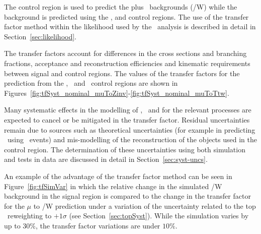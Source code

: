 The \mj control region is used to predict the \wj plus \ttbar~backgrounds (\ttbar/W) while the
\znunu background is predicted using the \mj, \mmj and \gj control regions. The use of 
the transfer factor method within the likelihood used by the
\alphat~analysis is described in detail in Section~\ref{sec:likelihood}.
%

The transfer factors account for differences in the cross sections and branching fractions,
acceptance and reconstruction efficiencies and kinematic requirements between signal 
and control regions. The values of the transfer factors for the prediction from the \mj,
\mmj~and \gj~control regions are shown in Figures~\ref{fig:tfSyst_nominal_muToZinv}-\ref{fig:tfSyst_nominal_muToTtw}.

Many systematic effects in the modelling of \scalht, \nb~and \njet for the relevant processes 
are expected to cancel or be mitigated in the transfer factor. Residual uncertainties 
remain due to sources such as theoretical uncertainties (for example
in predicting \znunu~using \gj~events) and mis-modelling of the reconstruction of the objects
used in the control region. The determination of these uncertainties using both simulation 
and tests in data are discussed in detail in Section~\ref{sec:syst-uncs}.

An example of the advantage of the transfer factor method can be seen 
in Figure~\ref{fig:tfSimVar} in which the relative change in the simulated \ttbar/W 
background in the signal region is compared to the change in the transfer factor for 
the $\mu$ to \ttbar/W prediction under a variation of
the uncertainty related to the top \pt~reweighting to $+1\sigma$
(see Section~\ref{sec:topSyst}). While the simulation varies 
by up to 30\%, the transfer factor variations are under $10\%$.

